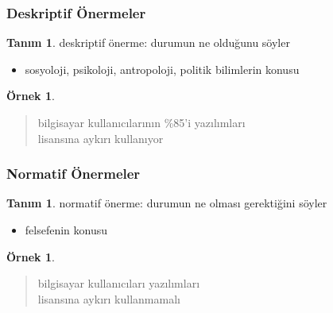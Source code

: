 \documentclass[dvipsnames]{beamer}
\theoremstyle{definition}
\newtheorem{tanim}[theorem]{Tanım}
\theoremstyle{example}
\newtheorem{ornek}[theorem]{Örnek}
\theoremstyle{plain}
\begin{document}
\begin{frame}
  \frametitle{Deskriptif Önermeler}

  \begin{tanim}
    \alert{deskriptif önerme}: durumun ne olduğunu söyler

    \begin{itemize}
      \item sosyoloji, psikoloji, antropoloji, politik bilimlerin konusu
    \end{itemize}
  \end{tanim}

  \pause
  \begin{ornek}
    \begin{quote}
      bilgisayar kullanıcılarının \%85'i yazılımları\\
      lisansına aykırı kullanıyor
    \end{quote}
  \end{ornek}
\end{frame}

\begin{frame}
  \frametitle{Normatif Önermeler}

  \begin{tanim}
    \alert{normatif önerme}: durumun ne olması gerektiğini söyler

    \begin{itemize}
      \item felsefenin konusu
    \end{itemize}
  \end{tanim}

  \pause
  \begin{ornek}
    \begin{quote}
      bilgisayar kullanıcıları yazılımları\\
      lisansına aykırı kullanmamalı
    \end{quote}
  \end{ornek}
\end{frame}
\end{document}

